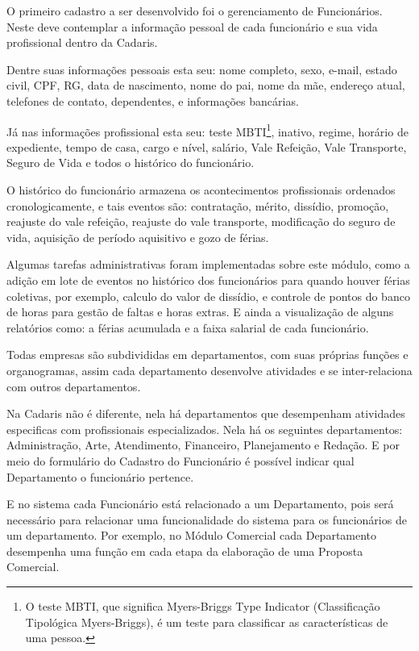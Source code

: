\documentclass[
  12pt,            %
  openany,
  oneside,
  a4paper,         %
  english,      %
  brazil
]{article}
\numberwithin{figure}{section}
\numberwithin{table}{section}
\newcounter{subsubsubsection}[subsubsection]
\begin{document}

O primeiro cadastro a ser desenvolvido foi o gerenciamento de Funcionários. Neste deve contemplar a informação pessoal de cada funcionário e sua vida profissional dentro da Cadaris.

Dentre suas informações pessoais esta seu: nome completo, sexo, e-mail, estado civil, CPF, RG, data de nascimento, nome do pai, nome da mãe, endereço atual, telefones de contato, dependentes, e informações bancárias.

Já nas informações profissional esta seu: teste MBTI\footnote{O teste MBTI, que significa Myers-Briggs Type Indicator (Classificação Tipológica Myers-Briggs), é um teste para classificar as características de uma pessoa.}, inativo, regime, horário de expediente, tempo de casa, cargo e nível, salário, Vale Refeição, Vale Transporte, Seguro de Vida e todos o histórico do funcionário.

O histórico do funcionário armazena os acontecimentos profissionais ordenados cronologicamente, e tais eventos são: contratação, mérito, dissídio, promoção, reajuste do vale refeição, reajuste do vale transporte, modificação do seguro de vida, aquisição de período aquisitivo e gozo de férias.

Algumas tarefas administrativas foram implementadas sobre este módulo, como a adição em lote de eventos no histórico dos funcionários para quando houver férias coletivas, por exemplo, calculo do valor de dissídio, e controle de pontos do banco de horas para gestão de faltas e horas extras. E ainda a visualização de alguns relatórios como: a férias acumulada e a faixa salarial de cada funcionário.



Todas empresas são subdivididas em departamentos, com suas próprias funções e organogramas, assim cada departamento desenvolve atividades e se inter-relaciona com outros departamentos.

Na Cadaris não é diferente, nela há departamentos que desempenham atividades especificas com profissionais especializados. Nela há os seguintes departamentos: Administração, Arte, Atendimento, Financeiro, Planejamento e Redação. E por meio do formulário do Cadastro do Funcionário é possível indicar qual Departamento o funcionário pertence.

E no sistema cada Funcionário está relacionado a um Departamento, pois será necessário para relacionar uma funcionalidade do sistema para os funcionários de um departamento. Por exemplo, no Módulo Comercial cada Departamento desempenha uma função em cada etapa da elaboração de uma Proposta Comercial.
\end{document}
